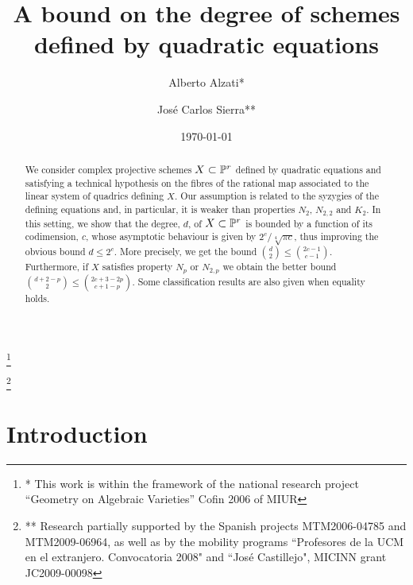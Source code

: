 \documentclass{amsart}
\theoremstyle{definition}
\begin{document}
\title{A bound on the degree of schemes defined by quadratic equations}
\author[Alberto Alzati \and Jos\'{e} Carlos Sierra]{Alberto Alzati* \and Jos\'{e} Carlos Sierra**}
\address{Dipartimento di Matematica, Universit\`a degli Studi di Milano\\
via Cesare Saldini 50, 20133 Milano (Italy)}

\address{Instituto de Ciencias Matem\'aticas (ICMAT), Campus de
Cantoblanco, Carretera de Colmenar km.15, 28049 Madrid (Spain)}
\thanks{* This work is within the framework of the national research project
``Geometry on Algebraic Varieties'' Cofin 2006 of MIUR}

\thanks{**
Research partially supported by the Spanish projects MTM2006-04785
and MTM2009-06964, as well as by the mobility programs ``Profesores
de la UCM en el extranjero. Convocatoria 2008" and ``Jos\'e
Castillejo", MICINN grant JC2009-00098}
\date{\today}
\begin{abstract}
We consider complex projective schemes $X\subset\Bbb{P}^{r}$ defined
by quadratic equations and satisfying a technical hypothesis on the
fibres of the rational map associated to the linear system of
quadrics defining $X$. Our assumption is related to the syzygies of
the defining equations and, in parti\-cular, it is weaker than
properties $N_2$, $N_{2,2}$ and $K_2$. In this setting, we show that
the degree, $d$, of $X\subset\Bbb{P}^{r}$ is bounded by a function
of its codimension, $c$, whose asymptotic behaviour is given by
${2^c}/{\sqrt[4]{\pi c}}$, thus improving the obvious bound $d\leq
2^c$. More precisely, we get the bound
$\binom{d}{2}\leq\binom{2c-1}{c-1}$. Furthermore, if $X$ satis\-fies
property $N_p$ or $N_{2,p}$ we obtain the better bound
$\binom{d+2-p}{2}\leq\binom{2c+3-2p}{c+1-p}$. Some classification
results are also given when equality holds.

\end{abstract}
\maketitle

\section{Introduction}
\end{document}
